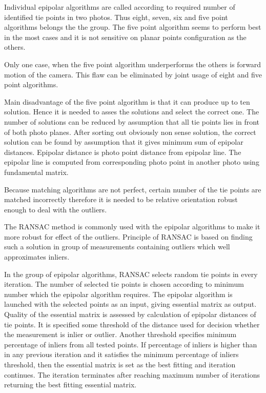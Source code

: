 \documentclass[a4paper,12pt]{article}
\begin{document}

Individual epipolar algorithms are called 
according to required number of identified tie points in two photos. Thus eight, seven, six and five point
algorithms belongs the the group. 
  The five point algorithm seems to perform best in the most
cases \cite{stewenius2006recent} and it is not sensitive on planar points configuration as the others.

Only one case, when the five point algorithm \cite{nister2004efficient} underperforms 
\cite{bruckner2008experimental} the others is forward motion of the camera.
This flaw can be eliminated by joint usage of eight and five point algorithms.

Main disadvantage of the five point algorithm is that it can produce up to ten solution.
Hence it is needed to asses the solutions and select the correct one. The number of solutions
can be reduced by assumption that all tie points lies in front of both photo 
planes. After sorting out obviously non sense solution,
 the correct solution can be found by assumption that it gives minimum sum of epipolar distances.
 Epipolar distance is photo point distance
 from epipolar line. The epipolar line is computed from corresponding photo point 
 in another photo using fundamental matrix.
  
Because matching algorithms are not perfect, certain number of the tie points are matched 
incorrectly therefore it is needed to be relative orientation robust enough to
deal with the outliers.

The RANSAC \cite{wiki:RANSAC} method is commonly used with the epipolar algorithms to 
make it more robust for effect of the outliers.
Principle of RANSAC is based on finding such a solution in group of measurements containing outliers 
which well approximates inliers.  

In the group of epipolar algorithms, RANSAC selects random tie points in every iteration.
The number of selected tie points is chosen according to minimum number which the epipolar algorithm requires.
The epipolar algorithm is launched with the selected points as an input, giving essential matrix
as output. 
Quality of the essential matrix is assessed by 
calculation of epipolar distances of tie points. It is specified some threshold of the distance used 
for decision whether the measurement is inlier or outlier. Another threshold specifies
 minimum percentage of inliers from all tested points. If percentage of inliers is higher than in any previous iteration
and it satisfies the minimum percentage of inliers threshold, then
the essential matrix is set as the best fitting and iteration continues. The iteration terminates after 
reaching maximum number of iterations returning the best fitting essential matrix.
\end{document}
